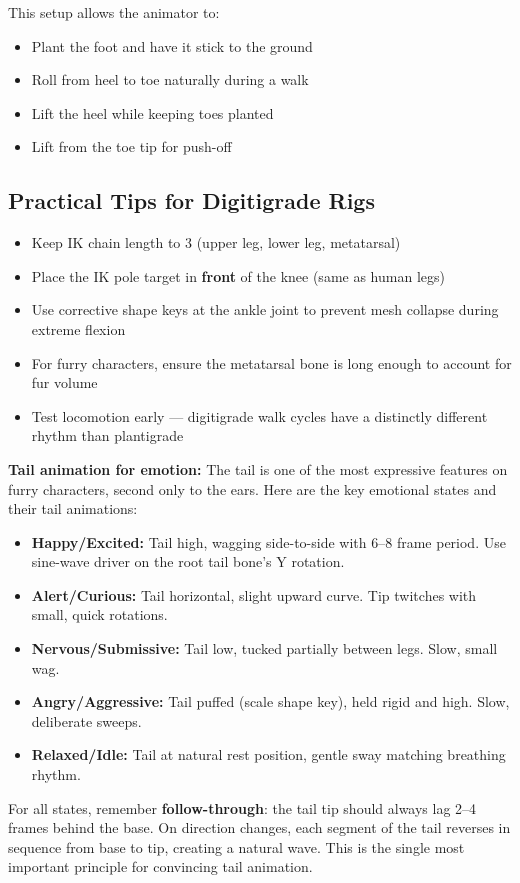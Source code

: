 This setup allows the animator to:

\begin{itemize}[leftmargin=2em]
  \item Plant the foot and have it stick to the ground
  \item Roll from heel to toe naturally during a walk
  \item Lift the heel while keeping toes planted
  \item Lift from the toe tip for push-off
\end{itemize}

\subsection{Practical Tips for Digitigrade Rigs}

\begin{itemize}[leftmargin=2em]
  \item Keep IK chain length to 3 (upper leg, lower leg, metatarsal)
  \item Place the IK pole target in \textbf{front} of the knee (same as human legs)
  \item Use corrective shape keys at the ankle joint to prevent mesh collapse during extreme flexion
  \item For furry characters, ensure the metatarsal bone is long enough to account for fur volume
  \item Test locomotion early --- digitigrade walk cycles have a distinctly different rhythm than plantigrade
\end{itemize}

\begin{furrybox}
\textbf{Tail animation for emotion:} The tail is one of the most expressive features on furry characters, second only to the ears. Here are the key emotional states and their tail animations:

\begin{itemize}[leftmargin=1.5em]
  \item \textbf{Happy/Excited:} Tail high, wagging side-to-side with 6--8 frame period. Use sine-wave driver on the root tail bone's Y rotation.
  \item \textbf{Alert/Curious:} Tail horizontal, slight upward curve. Tip twitches with small, quick rotations.
  \item \textbf{Nervous/Submissive:} Tail low, tucked partially between legs. Slow, small wag.
  \item \textbf{Angry/Aggressive:} Tail puffed (scale shape key), held rigid and high. Slow, deliberate sweeps.
  \item \textbf{Relaxed/Idle:} Tail at natural rest position, gentle sway matching breathing rhythm.
\end{itemize}

For all states, remember \textbf{follow-through}: the tail tip should always lag 2--4 frames behind the base. On direction changes, each segment of the tail reverses in sequence from base to tip, creating a natural wave. This is the single most important principle for convincing tail animation.
\end{furrybox}

